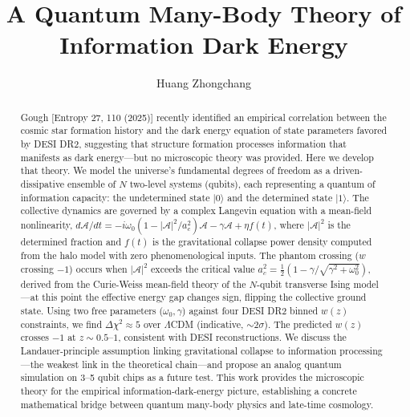 \documentclass[aps,prd,twocolumn,superscriptaddress]{revtex4-2}
\begin{document}
\title{A Quantum Many-Body Theory of Information Dark Energy}

\author{Huang Zhongchang}

\begin{abstract}
Gough [Entropy 27, 110 (2025)] recently identified an empirical correlation between the cosmic star formation history and the dark energy equation of state parameters favored by DESI DR2, suggesting that structure formation processes information that manifests as dark energy---but no microscopic theory was provided. Here we develop that theory. We model the universe's fundamental degrees of freedom as a driven-dissipative ensemble of $N$ two-level systems (qubits), each representing a quantum of information capacity: the undetermined state $|0\rangle$ and the determined state $|1\rangle$. The collective dynamics are governed by a complex Langevin equation with a mean-field nonlinearity, $d\mathcal{A}/dt = -i\omega_0(1-|\mathcal{A}|^2/a_c^2)\mathcal{A} - \gamma\mathcal{A} + \eta f(t)$, where $|\mathcal{A}|^2$ is the determined fraction and $f(t)$ is the gravitational collapse power density computed from the halo model with zero phenomenological inputs. The phantom crossing ($w$ crossing $-1$) occurs when $|\mathcal{A}|^2$ exceeds the critical value $a_c^2 = \frac{1}{2}(1-\gamma/\sqrt{\gamma^2+\omega_0^2})$, derived from the Curie-Weiss mean-field theory of the $N$-qubit transverse Ising model---at this point the effective energy gap changes sign, flipping the collective ground state. Using two free parameters ($\omega_0, \gamma$) against four DESI DR2 binned $w(z)$ constraints, we find $\Delta\chi^2 \approx 5$ over $\Lambda$CDM (indicative, $\sim 2\sigma$). The predicted $w(z)$ crosses $-1$ at $z \sim 0.5$--$1$, consistent with DESI reconstructions. We discuss the Landauer-principle assumption linking gravitational collapse to information processing---the weakest link in the theoretical chain---and propose an analog quantum simulation on 3--5 qubit chips as a future test. This work provides the microscopic theory for the empirical information-dark-energy picture, establishing a concrete mathematical bridge between quantum many-body physics and late-time cosmology.
\end{abstract}

\maketitle

\end{document}
